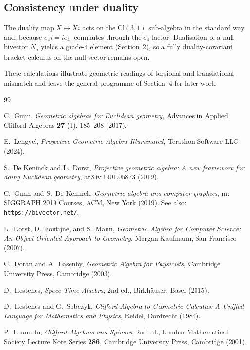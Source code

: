 \documentclass[dvipdfmx,a4paper]{article}
\theoremstyle{definition}
\theoremstyle{plain}
\theoremstyle{remark}
\begin{document}
\subsection{Consistency under duality}

The duality map \(X\mapsto Xi\) acts on the \(\mathrm{Cl}(3,1)\) sub-algebra in the standard way and, because \(e_{4}i=ie_{4}\), commutes through the \(e_{4}\)-factor. Dualisation of a null bivector \(N_{\mu}\) yields a grade-4 element (Section~2), so a fully duality-covariant bracket calculus on the null sector remains open.

These calculations illustrate geometric readings of torsional and translational mismatch and leave the general programme of Section~4 for later work.

\begin{thebibliography}{99}

C.~Gunn,
\textit{Geometric algebras for Euclidean geometry},
Advances in Applied Clifford Algebras \textbf{27} (1), 185--208 (2017).

E.~Lengyel,
\textit{Projective Geometric Algebra Illuminated},
Terathon Software LLC (2024).

S.~De Keninck and L.~Dorst,
\textit{Projective geometric algebra: A new framework for doing Euclidean geometry},
arXiv:1901.05873 (2019).

C.~Gunn and S.~De Keninck,
\textit{Geometric algebra and computer graphics},
in: SIGGRAPH 2019 Courses, ACM, New York (2019).
See also: \texttt{https://bivector.net/}.

L.~Dorst, D.~Fontijne, and S.~Mann,
\textit{Geometric Algebra for Computer Science: An Object-Oriented Approach to Geometry},
Morgan Kaufmann, San Francisco (2007).

C.~Doran and A.~Lasenby,
\textit{Geometric Algebra for Physicists},
Cambridge University Press, Cambridge (2003).

D.~Hestenes,
\textit{Space-Time Algebra}, 2nd ed.,
Birkh\"{a}user, Basel (2015).

D.~Hestenes and G.~Sobczyk,
\textit{Clifford Algebra to Geometric Calculus: A Unified Language for Mathematics and Physics},
Reidel, Dordrecht (1984).

P.~Lounesto,
\textit{Clifford Algebras and Spinors}, 2nd ed.,
London Mathematical Society Lecture Note Series \textbf{286},
Cambridge University Press, Cambridge (2001).


\end{thebibliography}
\end{document}
